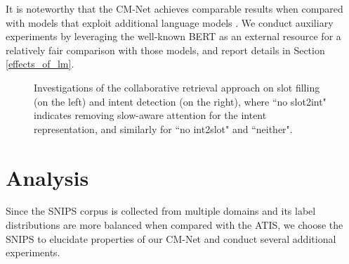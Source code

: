\documentclass[11pt,a4paper]{article}
\begin{document}
It is noteworthy that the CM-Net achieves comparable results when compared with models that exploit additional language models \cite{EMLo_bilstm_crf_2018,bert_2019}. We conduct auxiliary experiments by leveraging the well-known BERT \cite{BERT} as an external resource for a relatively fair comparison with those models, and report details in Section \ref{effects_of_lm}.

\begin{figure}[t!]
\begin{center}
      \caption{Investigations of the collaborative retrieval approach on slot filling (on the left) and intent detection (on the right), where ``no slot2int" indicates removing slow-aware attention for the intent representation, and similarly for ``no int2slot" and ``neither".
} 
      \label{analysis_mem}  
 \end{center}
\end{figure}


\begin{table}[t!]
\begin{center}
\end{center}
\caption{Ablation experiments on the SNIPS to investigate the impacts of various components, where ``- slot memory" indicates removing the slot memory and its interactions with other components correspondingly. Similarly for the other options.}
\label{ablation_studies}
\end{table}


\section{Analysis}
Since the SNIPS corpus is collected from multiple domains and its label distributions are more balanced when compared with the ATIS, we choose the SNIPS to elucidate properties of our CM-Net and conduct several additional experiments.
\end{document}
